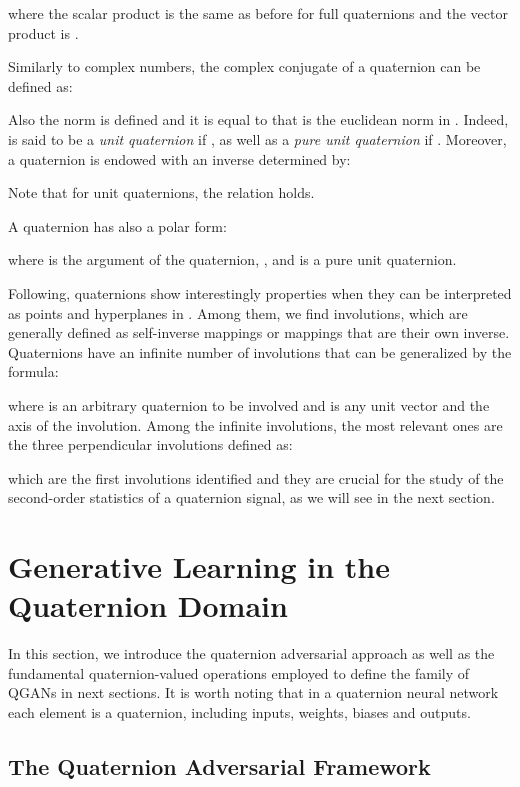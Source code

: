 \documentclass[graybox]{svmult}
\begin{document}
\noindent where the scalar product is the same as before for full quaternions and the vector product is . 

Similarly to complex numbers, the complex conjugate of a quaternion can be defined as:



\noindent Also the norm is defined and it is equal to  that is the euclidean norm in . Indeed,  is said to be a \textit{unit quaternion} if , as well as a \textit{pure unit quaternion} if . Moreover, a quaternion  is endowed with an inverse determined by:



\noindent Note that for unit quaternions, the relation  holds.

A quaternion has also a polar form: 


 
\noindent where  is the argument of the quaternion, ,   and  is a pure unit quaternion.

Following, quaternions show interestingly properties when they can be interpreted as points and hyperplanes in . Among them, we find involutions, which are generally defined as self-inverse mappings or mappings that are their own inverse.
Quaternions have an infinite number of involutions \cite{ELL2007137} that can be generalized by the formula:



\noindent where  is an arbitrary quaternion to be involved and  is any unit vector and the axis of the involution. Among the infinite involutions, the most relevant ones are the three perpendicular involutions defined as:



\noindent which are the first involutions identified \cite{Chernov1995} and they are crucial for the study of the second-order statistics of a quaternion signal, as we will see in the next section.

\section{Generative Learning in the Quaternion Domain}
\label{sec:qlearn}
In this section, we introduce the quaternion adversarial approach as well as the fundamental quaternion-valued operations employed to define the family of QGANs in next sections. It is worth noting that in a quaternion neural network each element is a quaternion, including inputs, weights, biases and outputs.

\subsection{The Quaternion Adversarial Framework}
\end{document}
